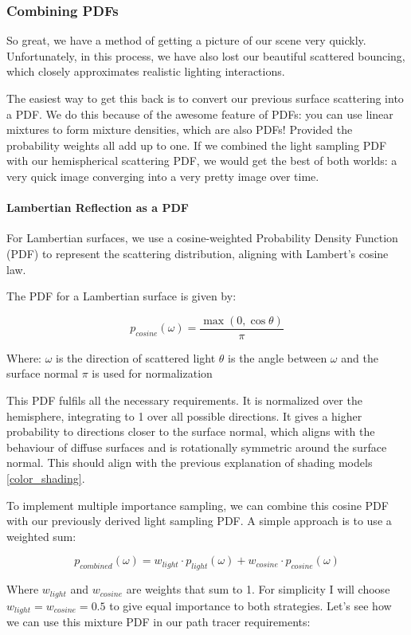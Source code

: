 \documentclass[12pt]{article}
\begin{document}
\subsubsection{Combining PDFs}

So great, we have a method of getting a picture of our scene very quickly. Unfortunately, in this process, we have also lost our beautiful scattered bouncing, which closely approximates realistic lighting interactions.

The easiest way to get this back is to convert our previous surface scattering into a PDF. We do this because of the awesome feature of PDFs: you can use linear mixtures to form mixture densities, which are also PDFs! Provided the probability weights all add up to one. If we combined the light sampling PDF with our hemispherical scattering PDF, we would get the best of both worlds: a very quick image converging into a very pretty image over time.


\paragraph{Lambertian Reflection as a PDF}

For Lambertian surfaces, we use a cosine-weighted Probability Density Function (PDF) to represent the scattering distribution, aligning with Lambert's cosine law.

The PDF for a Lambertian surface is given by:

$$p_{cosine}(\omega) = \frac{\max(0, \cos\theta)}{\pi}$$

Where:
$\omega$ is the direction of scattered light
$\theta$ is the angle between $\omega$ and the surface normal
$\pi$ is used for normalization

This PDF fulfils all the necessary requirements. It is normalized over the hemisphere, integrating to 1 over all possible directions. It gives a higher probability to directions closer to the surface normal, which aligns with the behaviour of diffuse surfaces and is rotationally symmetric around the surface normal. This should align with the previous explanation of shading models \ref{color_shading}.

To implement multiple importance sampling, we can combine this cosine PDF with our previously derived light sampling PDF. A simple approach is to use a weighted sum:

$$p_{combined}(\omega) = w_{light} \cdot p_{light}(\omega) + w_{cosine} \cdot p_{cosine}(\omega)$$

Where $w_{light}$ and $w_{cosine}$ are weights that sum to 1. For simplicity I will choose $w_{light} = w_{cosine} = 0.5$ to give equal importance to both strategies. Let's see how we can use this mixture PDF in our path tracer requirements:
\end{document}
